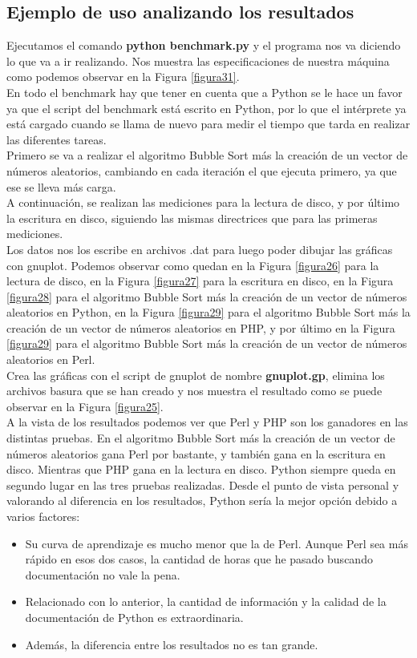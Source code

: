 \subsection{Ejemplo de uso analizando los resultados}
Ejecutamos el comando \textbf{python benchmark.py} y el programa nos va diciendo lo que va a ir realizando. Nos muestra las especificaciones de nuestra máquina como podemos observar en la Figura \ref{figura31}.\\
En todo el benchmark hay que tener en cuenta que a Python se le hace un favor ya que el script del benchmark está escrito en Python, por lo que el intérprete ya está cargado cuando se llama de nuevo para medir el tiempo que tarda en realizar las diferentes tareas.\\
Primero se va a realizar el algoritmo Bubble Sort más la creación de un vector de números aleatorios, cambiando en cada iteración el que ejecuta primero, ya que ese se lleva más carga.\\
A continuación, se realizan las mediciones para la lectura de disco, y por último la escritura en disco, siguiendo las mismas directrices que para las primeras mediciones.\\
Los datos nos los escribe en archivos .dat para luego poder dibujar las gráficas con gnuplot. Podemos observar como quedan en la Figura \ref{figura26} para la lectura de disco, en la Figura \ref{figura27} para la escritura en disco, en la Figura \ref{figura28} para el algoritmo Bubble Sort más la creación de un vector de números aleatorios en Python, en la Figura \ref{figura29} para el algoritmo Bubble Sort más la creación de un vector de números aleatorios en PHP, y por último en la Figura \ref{figura29} para el algoritmo Bubble Sort más la creación de un vector de números aleatorios en Perl.\\
Crea las gráficas con el script de gnuplot de nombre \textbf{gnuplot.gp}, elimina los archivos basura que se han creado y nos muestra el resultado como se puede observar en la Figura \ref{figura25}.\\

A la vista de los resultados podemos ver que Perl y PHP son los ganadores en las distintas pruebas. En el algoritmo Bubble Sort más la creación de un vector de números aleatorios gana Perl por bastante, y también gana en la escritura en disco. Mientras que PHP gana en la lectura en disco. Python siempre queda en segundo lugar en las tres pruebas realizadas. Desde el punto de vista personal y valorando al diferencia en los resultados, Python sería la mejor opción debido a varios factores:
\begin{itemize}
	\item Su curva de aprendizaje es mucho menor que la de Perl. Aunque Perl sea más rápido en esos dos casos, la cantidad de horas que he pasado buscando documentación no vale la pena.
	\item Relacionado con lo anterior, la cantidad de información y la calidad de la documentación de Python es extraordinaria.
	\item Además, la diferencia entre los resultados no es tan grande.
\end{itemize}

